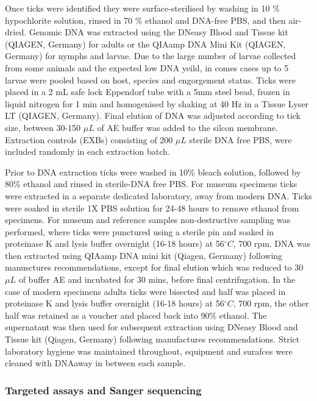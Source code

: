 \documentclass[a4paper, nobind]{templates/ociamthesis}
\begin{document}
Once ticks were identified they were surface-sterilised by washing in 10 \% hypochlorite solution, rinsed in 70 \% ethanol and DNA-free PBS, and then air-dried. Genomic DNA was extracted using the DNeasy Blood and Tissue kit (QIAGEN, Germany) for adults or the QIAamp DNA Mini Kit (QIAGEN, Germany) for nymphs and larvae.
Due to the large number of larvae collected from some animals and the expected low DNA yeild, in comes cases up to 5 larvae were pooled based on host, species and engorgement status.
Ticks were placed in a 2 mL safe lock Eppendorf tube with a 5mm steel bead, frozen in liquid nitrogen for 1 min and homogenised by shaking at 40 Hz in a Tissue Lyser LT (QIAGEN, Germany). Final elution of DNA was adjusted according to tick size, between 30-150 \(\mu L\) of AE buffer was added to the silcon membrane.
Extraction controls (EXBs) consisting of 200 \(\mu L\) sterile DNA free PBS, were included randomly in each extraction batch.

Prior to DNA extraction ticks were washed in 10\% bleach solution, followed by 80\% ethanol and rinsed in sterile-DNA free PBS. For museum specimens ticks were extracted in a separate dedicated laboratory, away from modern DNA. Ticks were soaked in sterile 1X PBS solution for 24-48 hours to remove ethanol from specimens. For museum and reference samples non-destructive sampling was performed, where ticks were punctured using a sterile pin and soaked in proteinase K and lysis buffer overnight (16-18 hours) at 56\(^\circ C\), 700 rpm.
DNA was then extracted using QIAamp DNA mini kit (Qiagen, Germany) following manusctures recommendations, except for final elution which was reduced to 30 \(\mu L\) of buffer AE and incubated for 30 mins, before final centrifugation.
In the case of modern specimens adults ticks were bisected and half was placed in proteinase K and lysis buffer overnight (16-18 hours) at 56\(^\circ C\), 700 rpm, the other half was retained as a voucher and placed back into 90\% ethanol.
The supernatant was then used for subsequent extraction using DNeasy Blood and Tissue kit (Qiagen, Germany) following manufactures recommendations. Strict laboratory hygiene was maintained throughout, equipment and surafces were cleaned with DNAaway in between each sample.

\hypertarget{targeted-assays-and-sanger-sequencing}{%
\subsubsection{Targeted assays and Sanger sequencing}\label{targeted-assays-and-sanger-sequencing}}
\end{document}
